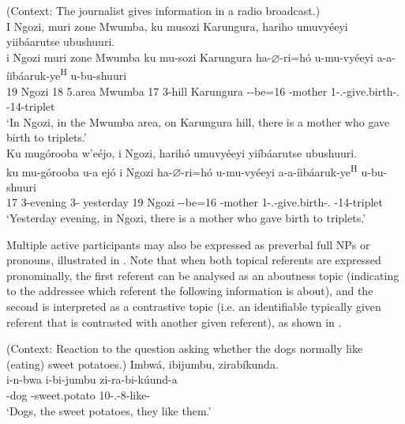 \documentclass[output=paper]{langscibook}
\begin{document}
\ea
(Context: The journalist gives information in a radio broadcast.)\\
\ea
\label{bkm:Ref74316186}
I Ngozi, muri zone Mwumba, ku musozi Karungura, hariho umuvyéeyi yiibáarutse ubushuuri.\\
\gll
  i  Ngozi  muri  zone  Mwumba  ku  mu-sozi  Karungura  ha-$\varnothing$-ri=hó  u-mu-vyéeyi  a-a-íibáaruk-ye\textsuperscript{H}  u-bu-shuuri\\
  19  Ngozi  18  5.area  Mwumba  17  3-hill  Karungura  \EXP-\PRS{}-be=16  -{}mother  1\SM-\N.\PST{}-give.birth-\PFV.\REL{}  \AUG{}-14-triplet\\
\glt
  ‘In Ngozi, in the Mwumba area, on Karungura hill, there is a mother who gave birth to triplets.’\\

\ex
\label{bkm:Ref74318587}
Ku mugórooba w’eéjo, i Ngozi, harihó umuvyéeyi yiíbáarutse ubushuuri.\\
\gll
ku  mu-górooba  u-a  ejó  i  Ngozi  ha-$\varnothing$-ri=hó  u-mu-vyéeyi   a-a-íibáaruk-ye\textsuperscript{H}  u-bu-shuuri \\
17  3-evening  3-\CONN{}  yesterday  19  Ngozi  \EXP-\PRS{}-be=16  -{}mother   1\SM-\N.\PST{}-give.birth-\PFV.\REL{}  \AUG{}-14-triplet \\
\glt
  ‘Yesterday evening, in Ngozi, there is a mother who gave birth to triplets.’\\

\z
\z

Multiple active participants may also be expressed as preverbal full NPs or pronouns, illustrated in . Note that when both topical referents are expressed pronominally, the first referent can be analysed as an aboutness topic (indicating to the addressee which referent the following information is about), and the second is interpreted as a contrastive topic (i.e. an identifiable typically given referent that is contrasted with another given referent), as shown in .

\ea
\label{bkm:Ref142552207}(Context: Reaction to the question asking whether the dogs normally like (eating) sweet potatoes.)
\ea
\label{bkm:Ref142552207:a}
Imbwá, ibijumbu, zirabíkunda.\\
\gll
i-n-bwa  i-bi-jumbu  zi-ra-bi-kúund-a\\
-dog  -{}sweet.potato  10\SM-\PRS.\DJ{}-8\OM{}-like-\FV{}\\
\glt
‘Dogs, the sweet potatoes, they like them.’\\
\end{document}
